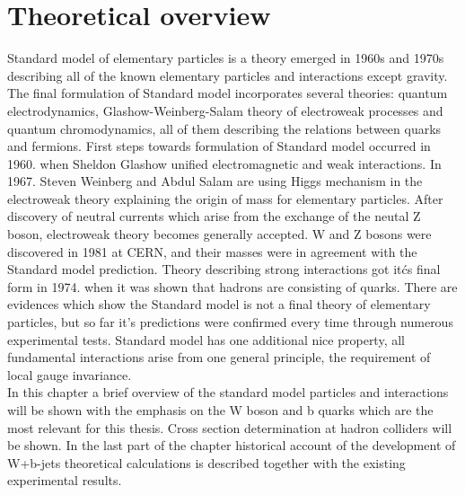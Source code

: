 
\chapter{Theoretical overview} %

\label{Chapter2} %


Standard model of elementary particles is a theory emerged in 1960s and 1970s describing all of the known elementary particles and interactions except gravity. The final formulation of Standard model incorporates several theories: quantum electrodynamics, Glashow-Weinberg-Salam theory of electroweak processes and quantum chromodynamics, all of them describing the relations between quarks and fermions. First steps towards formulation of Standard model occurred in 1960. when Sheldon Glashow unified electromagnetic and weak interactions. In 1967. Steven Weinberg and Abdul Salam are using Higgs mechanism in the electroweak theory explaining the origin of mass for elementary particles. After discovery of neutral currents which arise from the exchange of the neutal Z boson, electroweak theory becomes generally accepted. W and Z bosons were discovered in 1981 at CERN, and their masses were in agreement with the Standard model prediction. Theory describing strong interactions got itćs final form in 1974. when it was shown that hadrons are consisting of quarks. There are evidences which show the Standard model is not a final theory of elementary particles, but so far it's predictions were confirmed every time through numerous experimental tests. Standard model has one additional nice property, all fundamental interactions arise from one general principle, the requirement of local gauge invariance. \\
In this chapter a brief overview of the standard model particles and interactions will be shown with the emphasis on the W boson and b quarks which are the most relevant for this thesis. Cross section determination at hadron colliders will be shown.  In the last part of the chapter historical account of the development of W+b-jets theoretical calculations is described together with the existing experimental results.


